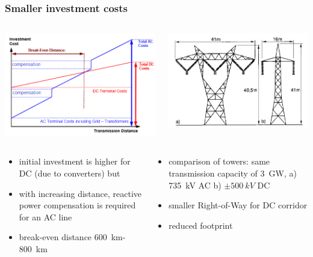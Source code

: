\begin{frame}
\frametitle{Smaller investment costs}
\begin{columns}
\begin{column}{0.5\linewidth}
\begin{center}
    \includegraphics[width=0.7\linewidth]{images/cost.png}
\end{center}
\end{column}
\begin{column}{0.5\linewidth}
\begin{center}
    \includegraphics[width=0.7\linewidth]{images/row.png}
\end{center}
\end{column}
\end{columns}
\begin{columns}
\begin{column}{0.5\linewidth}
\begin{itemize}
    \item initial investment is higher for DC (due to converters) but
    \item with increasing distance, reactive power compensation is required for an AC line
    \item break-even distance \SI{600}{km}-\SI{800}{km}
\end{itemize}
\end{column}
\begin{column}{0.5\linewidth}
\begin{itemize}
    \item comparison of towers: same transmission capacity of \SI{3}{GW}, a) \SI{735}{kV} AC b) $\pm \SI{500}{kV}$ DC
    \item smaller Right-of-Way for DC corridor
    \item reduced footprint
\end{itemize}
\end{column}
\end{columns}
\end{frame}

